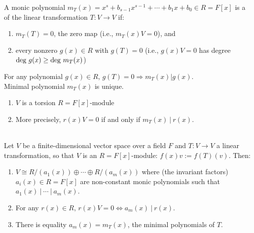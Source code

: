 \begin{definition}
A monic polynomial $m_T(x) = x^s + b_{s-1} x^{s-1} + \cdots + b_1 x + b_0 \in R = F[x]$ is a  of the linear transformation $T: V \rightarrow V$ if:
\begin{enumerate}[label=(\roman*)]
\item $m_T(T) = 0$, the zero map (i.e., $m_T(x)V = 0$), and
\item every nonzero $g(x) \in R$ with $g(T) = 0$ (i.e., $g(x)V = 0$ has degree $\degs \ g(x) \geq \degs \ m_T(x)$)
\end{enumerate}
For any polynomial $g(x) \in R$, $g(T) = 0 \Rightarrow m_T(x) | g(x)$.\\
Minimal polynomial $m_T(x)$ is unique.
\end{definition}

\begin{theorem}
\begin{enumerate}[label=(\roman*)]
\item $V$ is a torsion $R = F[x]$-module
\item More precisely, $r(x)V = 0$ if and only if $m_T(x) \ | \ r(x)$.
\end{enumerate}
\end{theorem}

\begin{theorem}
\label{thm:fundthmfvpeiff}
\\
Let $V$ be a finite-dimensional vector space over a field $F$ and $T: V \rightarrow V$ a linear transformation, so that $V$ is an $R = F[x]$-module: $f(x)v := f(T)(v)$. Then:
\begin{enumerate}[label=(\roman*)]
\item $V \cong R/(a_1(x)) \oplus \cdots \oplus R/(a_m(x))$ where (the invariant factors) $a_i(x) \in R = F[x]$ are non-constant monic polynomials such that $a_1(x) \ | \ \cdots \ | \ a_m(x)$.
\item For any $r(x) \in R$, $r(x)V=0 \Leftrightarrow a_m(x) \ | \ r(x)$.
\item There is equality $a_m(x) = m_T(x)$, the minimal polynomials of $T$.
\end{enumerate}
\end{theorem}

